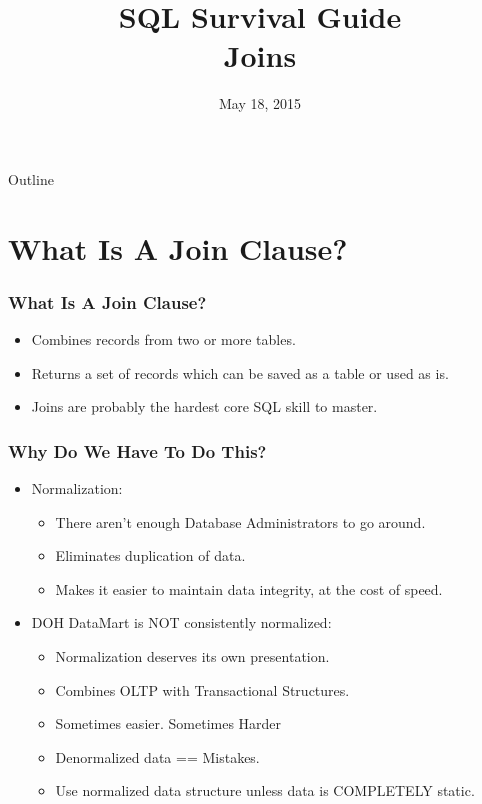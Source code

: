 \documentclass{beamer}
\title[SQL Survival Guide]{SQL Survival Guide\\Joins}
\institute{Office of Quality and Patient Safety}
\date{May 18, 2015}
\begin{document}
\begin{frame}
  \titlepage
\end{frame}

\begin{frame}{Outline}
  \tableofcontents
\end{frame}



\section{What Is A Join Clause?} %

\begin{frame}
  \frametitle{What Is A Join Clause?}
  \pause
  \begin{itemize}
  \item Combines records from two or more tables.
  \item Returns a set of records which can be saved as a table or used
    as is.
  \item Joins are probably the hardest core SQL skill to master.
  \end{itemize}
\end{frame}  

\begin{frame}
  \frametitle{Why Do We Have To Do This?}
  \begin{itemize}
  \item Normalization: 
    \begin{itemize}
    \item There aren't enough Database Administrators to go around.
    \item Eliminates duplication of data.
    \item Makes it easier to maintain data integrity, at the cost of
      speed.
    \end{itemize}
  \item DOH DataMart is NOT consistently normalized:
    \begin{itemize}
    \item Normalization deserves its own presentation.
    \item Combines OLTP with Transactional Structures.
    \item Sometimes easier. Sometimes Harder
    \item Denormalized data == Mistakes.
    \item Use normalized data structure unless data is COMPLETELY static.
    \end{itemize}
  \end{itemize}
\end{frame}  
\end{document}
